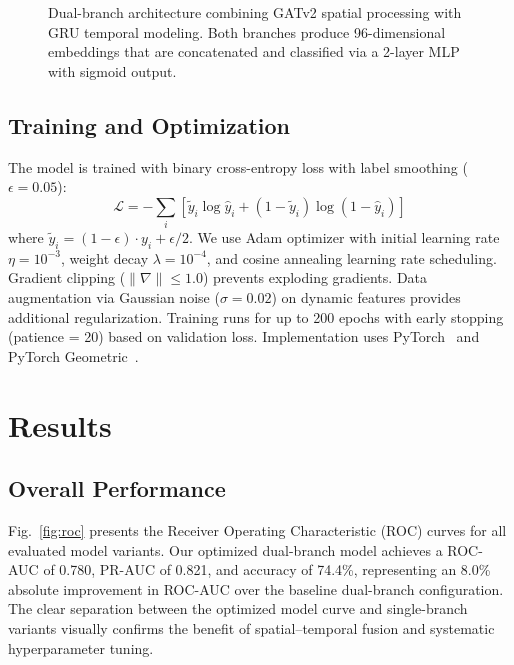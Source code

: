 \documentclass[conference]{IEEEtran}
\begin{document}
\begin{figure}[t]
{%
}
\caption{Dual-branch architecture combining GATv2 spatial processing with GRU temporal modeling. Both branches produce 96-dimensional embeddings that are concatenated and classified via a 2-layer MLP with sigmoid output.}
\label{fig:arch}
\end{figure}

\subsection{Training and Optimization}
The model is trained with binary cross-entropy loss with label smoothing ($\epsilon = 0.05$):
\begin{equation}
    \mathcal{L} = -\sum_i \left[\tilde{y}_i \log \hat{y}_i + (1 - \tilde{y}_i) \log(1 - \hat{y}_i)\right]
\end{equation}
where $\tilde{y}_i = (1 - \epsilon) \cdot y_i + \epsilon / 2$. We use Adam optimizer with initial learning rate $\eta = 10^{-3}$, weight decay $\lambda = 10^{-4}$, and cosine annealing learning rate scheduling. Gradient clipping ($\|\nabla\| \leq 1.0$) prevents exploding gradients. Data augmentation via Gaussian noise ($\sigma = 0.02$) on dynamic features provides additional regularization. Training runs for up to 200 epochs with early stopping (patience = 20) based on validation loss. Implementation uses PyTorch~\cite{paszke2019pytorch} and PyTorch Geometric~\cite{fey2019fast}.

\section{Results}

\subsection{Overall Performance}
Fig.~\ref{fig:roc} presents the Receiver Operating Characteristic (ROC) curves for all evaluated model variants. Our optimized dual-branch model achieves a ROC-AUC of 0.780, PR-AUC of 0.821, and accuracy of 74.4\%, representing an 8.0\% absolute improvement in ROC-AUC over the baseline dual-branch configuration. The clear separation between the optimized model curve and single-branch variants visually confirms the benefit of spatial--temporal fusion and systematic hyperparameter tuning.
\end{document}
